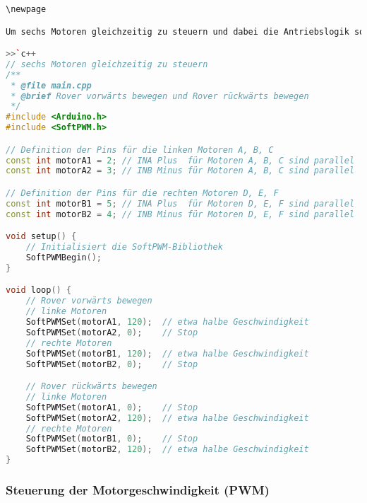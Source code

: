 \documentclass{vorlage-design-main}
\begin{document}
\begin{lstlisting}[language={C++}]
\newpage

Um sechs Motoren gleichzeitig zu steuern und dabei die Antriebslogik sowie die Nutzung der SoftPWM-Bibliothek für das Arduino-Board zu berücksichtigen, muss der vorgegebene Code erweitert werden.

>>`c++
// sechs Motoren gleichzeitig zu steuern
/**
 * @file main.cpp
 * @brief Rover vorwärts bewegen und Rover rückwärts bewegen
 */
#include <Arduino.h>
#include <SoftPWM.h>

// Definition der Pins für die linken Motoren A, B, C
const int motorA1 = 2; // INA Plus  für Motoren A, B, C sind parallel
const int motorA2 = 3; // INB Minus für Motoren A, B, C sind parallel

// Definition der Pins für die rechten Motoren D, E, F
const int motorB1 = 5; // INA Plus  für Motoren D, E, F sind parallel
const int motorB2 = 4; // INB Minus für Motoren D, E, F sind parallel

void setup() {
    // Initialisiert die SoftPWM-Bibliothek
    SoftPWMBegin();
}

void loop() {
    // Rover vorwärts bewegen
    // linke Motoren
    SoftPWMSet(motorA1, 120);  // etwa halbe Geschwindigkeit
    SoftPWMSet(motorA2, 0);    // Stop
    // rechte Motoren
    SoftPWMSet(motorB1, 120);  // etwa halbe Geschwindigkeit
    SoftPWMSet(motorB2, 0);    // Stop

    // Rover rückwärts bewegen
    // linke Motoren
    SoftPWMSet(motorA1, 0);    // Stop
    SoftPWMSet(motorA2, 120);  // etwa halbe Geschwindigkeit
    // rechte Motoren
    SoftPWMSet(motorB1, 0);    // Stop
    SoftPWMSet(motorB2, 120);  // etwa halbe Geschwindigkeit
}
\end{lstlisting}

\hypertarget{steuerung-der-motorgeschwindigkeit-pwm}{%
\subsubsection{Steuerung der Motorgeschwindigkeit
(PWM)}\label{steuerung-der-motorgeschwindigkeit-pwm}}
\end{document}
